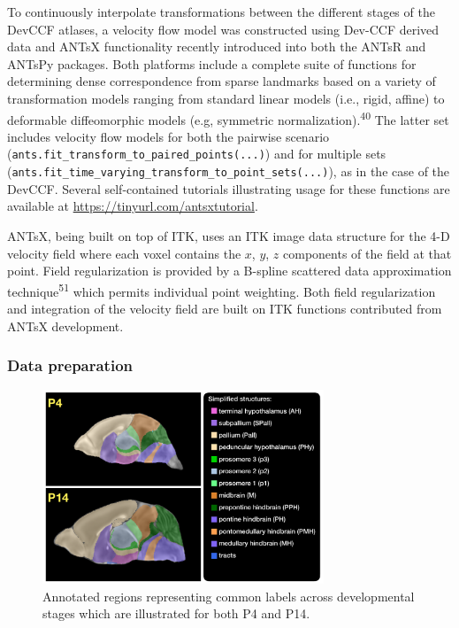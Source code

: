 \documentclass[
  12pt,
]{article}
\begin{document}
To continuously interpolate transformations between the different stages
of the DevCCF atlases, a velocity flow model was constructed using
Dev-CCF derived data and ANTsX functionality recently introduced into
both the ANTsR and ANTsPy packages. Both platforms include a complete
suite of functions for determining dense correspondence from sparse
landmarks based on a variety of transformation models ranging from
standard linear models (i.e., rigid, affine) to deformable diffeomorphic
models (e.g, symmetric normalization).\textsuperscript{40} The latter
set includes velocity flow models for both the pairwise scenario
(\texttt{ants.fit\_transform\_to\_paired\_points(...)}) and for multiple
sets
(\texttt{ants.fit\_time\_varying\_transform\_to\_point\_sets(...)}), as
in the case of the DevCCF. Several self-contained tutorials illustrating
usage for these functions are available at
\url{https://tinyurl.com/antsxtutorial}.

ANTsX, being built on top of ITK, uses an ITK image data structure for
the 4-D velocity field where each voxel contains the \(x\), \(y\), \(z\)
components of the field at that point. Field regularization is provided
by a B-spline scattered data approximation technique\textsuperscript{51}
which permits individual point weighting. Both field regularization and
integration of the velocity field are built on ITK functions contributed
from ANTsX development.

\hypertarget{data-preparation-1}{%
\subsubsection*{Data preparation}\label{data-preparation-1}}

\begin{figure}[!htb]
\centering
\includegraphics[width=0.75\textwidth]{Figures/SimplifiedAnnotations.pdf}
\caption{Annotated regions representing common labels across developmental stages which
are illustrated for both P4 and P14.}
\label{fig:simplifiedannotations}
\end{figure}
\end{document}
